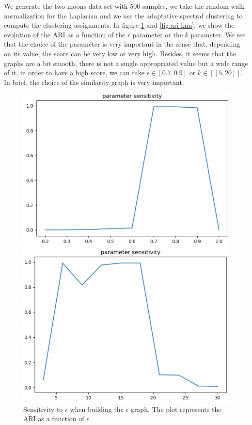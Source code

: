 \documentclass[a4paper, 11pt]{report}
\begin{document}
    We generate the two moons data set with $500$ samples, we take the random walk normalization for the Laplacian and we use the adaptative spectral clustering to compute the clustering assignments. In figure \ref{fig:ari-eps} and \ref{fig:ari-knn}, we show the evolution of the ARI as a function of the $\epsilon$ parameter or the $k$ parameter. We see that the choice of the parameter is very important in the sense that, depending on its value, the score can be very low or very high. Besides, it seems that the graphs are a bit smooth, \ie there is not a single appropriated value but a wide range of it, \eg in order to have a high score, we can take $\epsilon \in [0.7, 0.9]$ or $k \in [\![ 5, 20 ]\!]$. In brief, the choice of the similarity graph is very important.

    \begin{figure}[!h]
    \begin{minipage}{.45\textwidth}
        \centering
        \includegraphics[scale=0.5]{images/ari_eps.jpg}
        \caption{Sensitivity to $\epsilon$ when building the $\epsilon$ graph. The plot represents the ARI as a function of $\epsilon$.}
        \label{fig:ari-eps}
    \end{minipage}
    \hfill
    \begin{minipage}{.45\textwidth}
        \centering
        \includegraphics[scale=0.5]{images/ari_knn.jpg}

\end{minipage}
\end{figure}
\end{document}
